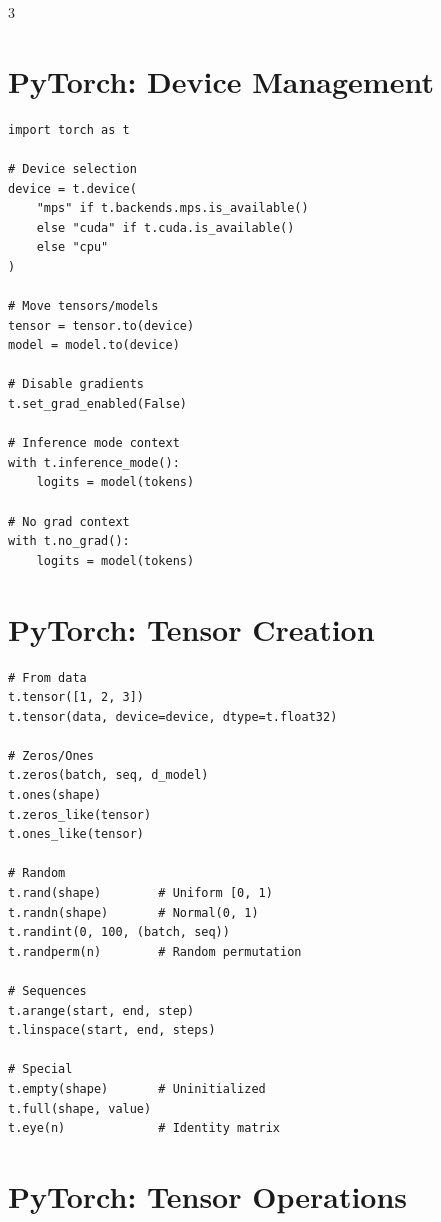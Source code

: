 \documentclass[10pt,a4paper,landscape]{article}
\begin{document}
\begin{multicols}{3}
\section{PyTorch: Device Management}

\begin{lstlisting}
import torch as t

# Device selection
device = t.device(
    "mps" if t.backends.mps.is_available()
    else "cuda" if t.cuda.is_available()
    else "cpu"
)

# Move tensors/models
tensor = tensor.to(device)
model = model.to(device)

# Disable gradients
t.set_grad_enabled(False)

# Inference mode context
with t.inference_mode():
    logits = model(tokens)

# No grad context
with t.no_grad():
    logits = model(tokens)
\end{lstlisting}

\section{PyTorch: Tensor Creation}

\begin{lstlisting}
# From data
t.tensor([1, 2, 3])
t.tensor(data, device=device, dtype=t.float32)

# Zeros/Ones
t.zeros(batch, seq, d_model)
t.ones(shape)
t.zeros_like(tensor)
t.ones_like(tensor)

# Random
t.rand(shape)        # Uniform [0, 1)
t.randn(shape)       # Normal(0, 1)
t.randint(0, 100, (batch, seq))
t.randperm(n)        # Random permutation

# Sequences
t.arange(start, end, step)
t.linspace(start, end, steps)

# Special
t.empty(shape)       # Uninitialized
t.full(shape, value)
t.eye(n)             # Identity matrix
\end{lstlisting}

\section{PyTorch: Tensor Operations}


\end{multicols}
\end{document}
